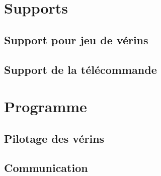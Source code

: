 \section{Supports}
\subsection{Support pour jeu de vérins}
\subsection{Support de la télécommande}

\section{Programme}
\subsection{Pilotage des vérins}
\subsection{Communication}